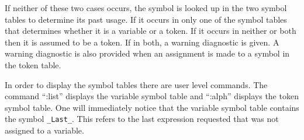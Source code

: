 If neither of these two cases occurs, the symbol is looked up in the two
symbol tables to determine its past usage.
If it occurs in only one of the symbol tables that determines whether it is
a variable or a token.
If it occurs in neither or both then it is assumed to be a token.
If in both, a warning diagnostic is given.
A warning diagnostic is also provided when an assignment is made to a
symbol in the token table.

In order to display the symbol tables there are user level commands.
The command ``:list'' displays the variable symbol table and ``:alph''
displays the token symbol table.
One will immediately notice that the variable symbol table contains the
symbol \verb#_Last_#.
This refers to the last expression requested that was not assigned to a
variable.
